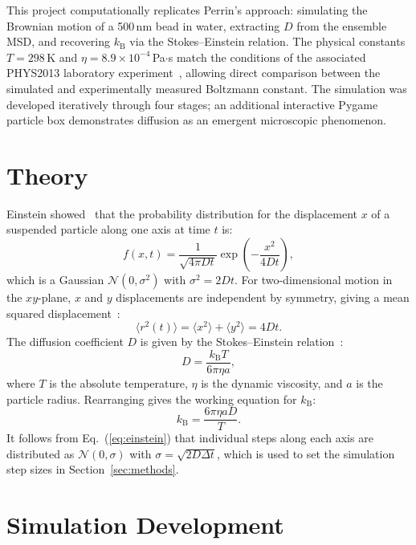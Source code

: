\documentclass[prb,twocolumn]{revtex4-1}
\begin{document}
This project computationally replicates Perrin's approach: simulating the Brownian motion of a 500\,nm bead in water, extracting $D$ from the ensemble MSD, and recovering $k_{\mathrm{B}}$ via the Stokes--Einstein relation. The physical constants $T = 298$\,K and $\eta = 8.9\times10^{-4}$\,Pa$\cdot$s match the conditions of the associated PHYS2013 laboratory experiment~\cite{lukacs2026lab}, allowing direct comparison between the simulated and experimentally measured Boltzmann constant. The simulation was developed iteratively through four stages; an additional interactive Pygame particle box demonstrates diffusion as an emergent microscopic phenomenon.

\section{Theory}

Einstein showed~\cite{einstein1905} that the probability distribution for the displacement $x$ of a suspended particle along one axis at time $t$ is:
\begin{equation}
f(x,t) = \frac{1}{\sqrt{4\pi D t}}\exp\!\left(-\frac{x^2}{4Dt}\right),
\label{eq:einstein}
\end{equation}
which is a Gaussian $\mathcal{N}(0,\sigma^2)$ with $\sigma^2 = 2Dt$. For two-dimensional motion in the $xy$-plane, $x$ and $y$ displacements are independent by symmetry, giving a mean squared displacement~\cite{reif1965}:
\begin{equation}
\langle r^2(t)\rangle = \langle x^2\rangle + \langle y^2\rangle = 4Dt.
\label{eq:msd}
\end{equation}
The diffusion coefficient $D$ is given by the Stokes--Einstein relation~\cite{einstein1905}:
\begin{equation}
D = \frac{k_{\mathrm{B}}T}{6\pi\eta a},
\label{eq:stokes}
\end{equation}
where $T$ is the absolute temperature, $\eta$ is the dynamic viscosity, and $a$ is the particle radius. Rearranging gives the working equation for $k_{\mathrm{B}}$:
\begin{equation}
k_{\mathrm{B}} = \frac{6\pi\eta a D}{T}.
\label{eq:kb}
\end{equation}
It follows from Eq.~(\ref{eq:einstein}) that individual steps along each axis are distributed as $\mathcal{N}(0,\sigma)$ with $\sigma = \sqrt{2D\Delta t}$, which is used to set the simulation step sizes in Section~\ref{sec:methods}.

\section{Simulation Development}
\label{sec:dev}
\end{document}

